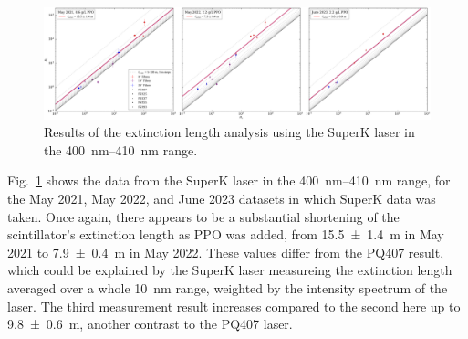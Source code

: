 \begin{figure}
    \centering
    \includegraphics[width=\textwidth]{5_SMELLIEAnalysis/images/rsrw_plot_combined_superK[400,410].pdf}
    \caption[Results of the extinction length analysis using the SuperK laser in the \SIrange{400}{410}{\nm} range]
    {Results of the extinction length analysis using the SuperK laser in the \SIrange{400}{410}{\nm} range.}
    \label{fig:smellie_ext_length_results_SK_400410}
\end{figure}

Fig.~\ref{fig:smellie_ext_length_results_SK_400410} shows the data from the SuperK laser in the \SIrange{400}{410}{\nm} range, for the May 2021, May 2022, and June 2023 datasets in which SuperK data was taken. Once again, there appears to be a substantial shortening of the scintillator's extinction length as PPO was added, from \SI{15.5 \pm 1.4}{\metre} in May 2021 to \SI{7.9 \pm 0.4}{\metre} in May 2022. These values differ from the PQ407 result, which could be explained by the SuperK laser measureing the extinction length averaged over a whole \SI{10}{\nm} range, weighted by the intensity spectrum of the laser. The third measurement result increases compared to the second here up to \SI{9.8 \pm 0.6}{\metre}, another contrast to the PQ407 laser.



